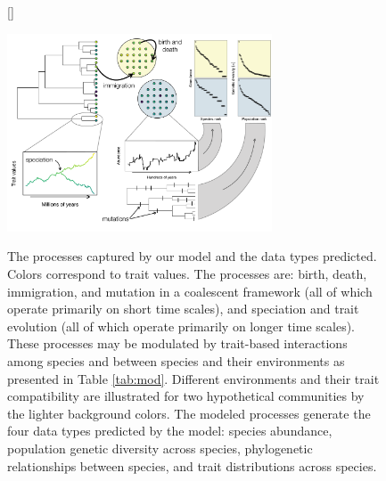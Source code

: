 \documentclass[11pt]{article}
\begin{document}
\begin{figure}[htb]
  [\FBwidth]
  {\caption{The processes captured by our model and the data types
      predicted. Colors correspond to trait values. The processes are:
      birth, death, immigration, and mutation in a coalescent
      framework (all of which operate primarily on short time scales),
      and speciation and trait evolution (all of which operate
      primarily on longer time scales). These processes may be
      modulated by trait-based interactions among species and between
      species and their environments as presented in Table
      \ref{tab:mod}.  Different environments and their trait
      compatibility are illustrated for two hypothetical communities
      by the lighter background colors. The modeled processes generate
      the four data types predicted by the model: species abundance,
      population genetic diversity across species, phylogenetic
      relationships between species, and trait distributions across
      species.  }\label{fig:mod}}
{\includegraphics[width=0.7\textwidth]{../fig_mod.pdf}}
\end{figure}

\end{document}
